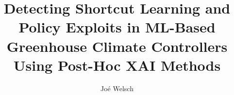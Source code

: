 
\title{Detecting Shortcut Learning and Policy Exploits in ML-Based Greenhouse Climate Controllers Using Post-Hoc XAI Methods}
%
%

\author{Joé Welsch}
%
%




%
\maketitle              %
%
